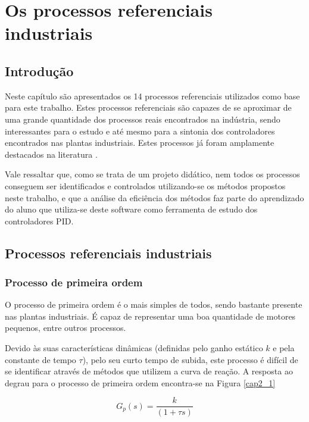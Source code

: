 \chapter{Os processos referenciais industriais
    \label{cap:processos-referenciais}}

\section{Introdução}

Neste capítulo são apresentados os 14 processos referenciais utilizados
como base para este trabalho. Estes processos referenciais são capazes de se
aproximar de uma grande quantidade dos processos reais encontrados na indústria,
sendo interessantes para o estudo e até mesmo para a sintonia dos controladores
encontrados nas plantas industriais. Estes processos já foram amplamente destacados
na literatura \cite{Isermann:1981:DCS:539455} \cite{ast+hagg100}.

Vale ressaltar que, como se trata de um projeto didático, nem todos os processos
conseguem ser identificados e controlados utilizando-se os métodos propostos
neste trabalho, e que a análise da eficiência dos métodos faz parte do aprendizado
do aluno que utiliza-se deste software como ferramenta de estudo dos controladores
\acs{PID}.

\section{Processos referenciais industriais}

\subsection{Processo de primeira ordem}
    
    O processo de primeira ordem é o mais simples de todos, sendo bastante presente
    nas plantas industriais. É capaz de representar uma boa quantidade de motores
    pequenos, entre outros processos.
    
    Devido às suas características dinâmicas (definidas pelo ganho estático $k$ e
    pela constante de tempo $\tau$), pelo seu curto tempo de subida, este processo
    é difícil de se identificar através de métodos que utilizem a curva de reação.
    A resposta ao degrau para o processo de primeira ordem encontra-se na Figura
    \ref{cap2_1}
    
    \begin{equation}
        G_p(s) = \frac{k}{(1+\tau s)}
    \end{equation}
    
